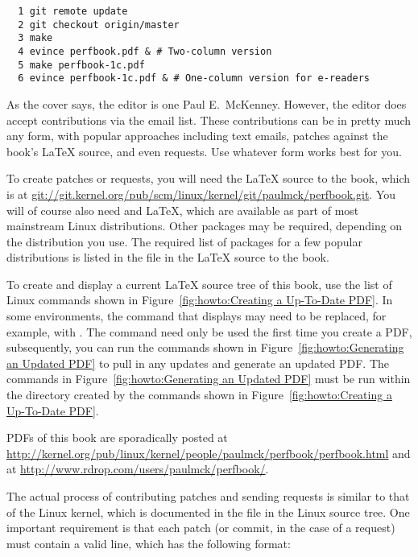 \begin{figure*}[tbp]
{
\scriptsize
\begin{verbatim}
  1 git remote update
  2 git checkout origin/master
  3 make
  4 evince perfbook.pdf & # Two-column version
  5 make perfbook-1c.pdf
  6 evince perfbook-1c.pdf & # One-column version for e-readers
\end{verbatim}
}
\caption{Generating an Updated PDF}
\label{fig:howto:Generating an Updated PDF}
\end{figure*}

As the cover says, the editor is one Paul E.~McKenney.
However, the editor does accept contributions via the
 email list.
These contributions can be in pretty much any form, with popular
approaches including text emails,
patches against the book's \LaTeX{} source, and even  requests.
Use whatever form works best for you.

To create patches or  requests, you will need the
\LaTeX{} source to the book, which is at
\url{git://git.kernel.org/pub/scm/linux/kernel/git/paulmck/perfbook.git}.
You will of course also need  and \LaTeX{}, which are
available as part of most mainstream Linux distributions.
Other packages may be required, depending on the distribution you use.
The required list of packages for a few popular distributions is listed
in the file  in the \LaTeX{} source to the book.

To create and display a current \LaTeX{} source tree of this book,
use the list of Linux commands shown in
Figure~\ref{fig:howto:Creating a Up-To-Date PDF}.
In some environments, the  command that displays 
may need to be replaced, for example, with .
The  command need only be used the first time you
create a PDF, subsequently, you can run the commands shown in
Figure~\ref{fig:howto:Generating an Updated PDF} to pull in any updates
and generate an updated PDF.
The commands in
Figure~\ref{fig:howto:Generating an Updated PDF}
must be run within the  directory created by the commands
shown in
Figure~\ref{fig:howto:Creating a Up-To-Date PDF}.

PDFs of this book are sporadically posted at
\url{http://kernel.org/pub/linux/kernel/people/paulmck/perfbook/perfbook.html}
and at
\url{http://www.rdrop.com/users/paulmck/perfbook/}.

The actual process of contributing patches and sending 
requests is similar to that of the Linux kernel, which is documented
in the  file in the Linux source tree.
One important requirement is that each patch (or commit, in the case
of a  request) must contain a valid  line,
which has the following format:

